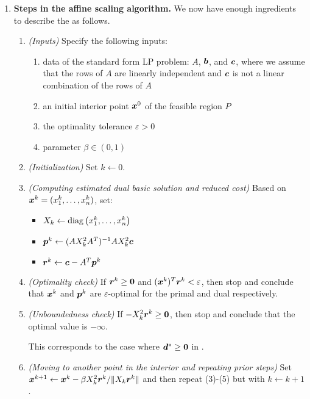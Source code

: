 \begin{enumerate}
\begin{pf}
\end{pf}
\item\label{it:affine-scal-steps} \textbf{Steps in the affine scaling
algorithm.} We now have enough ingredients to describe the  as follows.
\begin{enumerate}[label={(\arabic*)}]
\item \emph{(Inputs)} Specify the following inputs:
\begin{enumerate}
\item data of the standard form LP problem: \(A\), \(\bm{b}\), and
\(\bm{c}\), where we assume that the rows of \(A\) are linearly independent
and \(\bm{c}\) is not a linear combination of the rows of \(A\)
\item an initial interior point \(\bm{x}^0\) of the feasible region \(P\)
\item the optimality tolerance \(\varepsilon>0\)
\item parameter \(\beta\in (0,1)\)
\end{enumerate}
\item \emph{(Initialization)} Set \(k\leftarrow 0\).
\item \emph{(Computing estimated dual basic solution and reduced cost)} Based
on \(\bm{x}^{k}=(x_1^{k},\dotsc,x_n^{k})\), set:
\begin{itemize}
\item \(X_k\leftarrow\operatorname{diag}\left(x_1^{k},\dotsc,x_n^{k}\right)\)
\item \(\bm{p}^{k}\leftarrow (AX_k^{2}A^{T})^{-1}AX_{k}^{2}\bm{c}\)
\item \(\bm{r}^{k}\leftarrow \bm{c}-A^{T}\bm{p}^{k}\)
\end{itemize}
\item \emph{(Optimality check)} If \(\bm{r}^{k}\ge\bm{0}\) and
\((\bm{x}^{k})^{T}\bm{r}^{k}<\varepsilon\), then stop and conclude that
\(\bm{x}^{k}\) and \(\bm{p}^{k}\) are \(\varepsilon\)-optimal for the
primal and dual respectively.
\item \emph{(Unboundedness check)} If \(-X_k^{2}\bm{r}^{k}\ge\bm{0}\), then
stop and conclude that the optimal value is \(-\infty\).
\begin{note}
This corresponds to the case where \(\bm{d}^{*}\ge\bm{0}\) in
.
\end{note}
\item \emph{(Moving to another point in the interior and repeating prior steps)}
Set \(\bm{x}^{k+1}\leftarrow \bm{x}^{k}-\beta
X_k^{2}\bm{r}^{k}/\|X_k\bm{r}^{k}\|\) and then repeat (3)-(5) but with
\(k\leftarrow k+1\).


\end{enumerate}
\end{enumerate}
